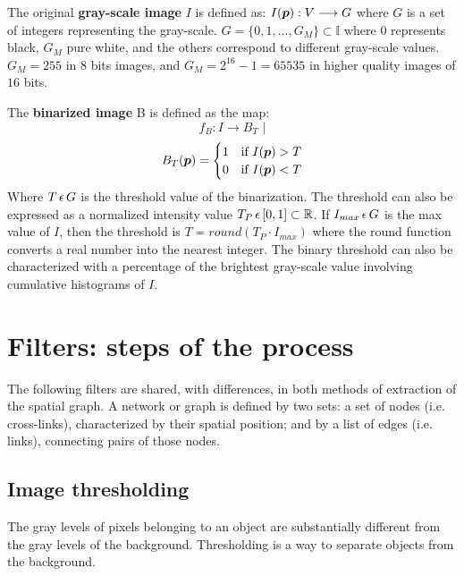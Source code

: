  The original \textbf{gray-scale image} $I$ is defined as:
 $I(\boldsymbol{p}):V \longrightarrow G$ where
 $G$ is a set of integers representing the gray-scale.
 $G=\{0,1,\ldots,G_M\}\subset\mathbb{I}$ where $0$ represents black, $G_M$
pure white, and the others correspond to different gray-scale values. $G_M=255$
in $8$ bits images, and $G_M=2^{16} - 1 = 65535$ in higher quality images of $16$ bits. 

The \textbf{binarized image} B is defined as the map:
$$f_B: I \longrightarrow B_T \,\,|$$ 
\begin{equation}
 B_T(\boldsymbol{p})=
   \begin{cases} 
     1               & \mbox{if } I(\boldsymbol{p}) > T   \\
     0               & \mbox{if } I(\boldsymbol{p}) < T
   \end{cases}
   \label{eq:bin}
\end{equation}
Where $T\,\epsilon \,{}G$ is the threshold value of the binarization. The threshold can also be expressed as
a normalized intensity value $T_P \,\epsilon \,{}[0,1]\subset \mathbb{R}$. If 
$I_{max}\,\epsilon \,{}G$ is the max value of $I$, then the threshold  is
$T=round(T_P \cdot I_{max})$  where the round function converts a real number
into the nearest integer. The binary threshold can also be characterized with a percentage of the
brightest gray-scale value involving
cumulative histograms of $I$.

\section{Filters: steps of the process}
The following filters are shared, with differences, in both methods of
extraction of the spatial graph. A network or graph is defined by two sets:
a set of nodes (i.e. cross-links), characterized by their spatial position; and
by a list of edges (i.e. links), connecting pairs of those nodes.
\subsection{Image thresholding}
The gray levels of pixels belonging to an object are substantially
different from the gray levels of the background. Thresholding is a way to
separate objects from the background.

